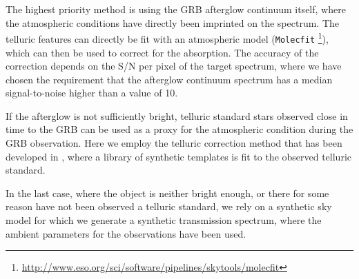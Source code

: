 \documentclass{aa}    %
\begin{document}
The highest priority method is using the GRB afterglow continuum itself, where
the atmospheric conditions have directly been imprinted on the spectrum. The
telluric features can directly be fit with an atmospheric model
(\texttt{Molecfit} \citep{Smette2015,
	Kausch2015}\footnote{\url{http://www.eso.org/sci/software/pipelines/skytools/molecfit}}), which can then be used to correct for the absorption. The accuracy of the correction depends on the S/N per pixel of the target spectrum, where we have chosen the requirement that the afterglow continuum spectrum has a median signal-to-noise higher than a value of 10.

If the afterglow is not sufficiently bright, telluric standard stars observed
close in time to the GRB can be used as a proxy for the atmospheric
condition during the GRB observation. Here we employ the telluric correction
method that has been developed in \citet{Selsing2015}, where a library of
synthetic templates is fit to the observed telluric standard.

In the last case, where the object is neither bright enough, or there for some
reason have not been observed a telluric standard, we rely on a synthetic sky
model \citep{Noll2012, Jones2013} for which we generate a
synthetic transmission spectrum, where the ambient parameters for the
observations have been used.
\end{document}
